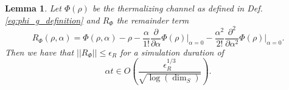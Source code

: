 \documentclass{article}
\newtheorem{lemma}[theorem]{Lemma}
\newcommand{\parens}[1]{\left( #1 \right)}
\newcommand{\norm}[1]{\left| \left| #1 \right| \right|}
\begin{document}
\begin{lemma} \label{lem:remainder_bound}
    Let $\Phi(\rho)$ be the thermalizing channel as defined in Def. \eqref{eq:phi_g_definition} and $R_{\Phi}$ the remainder term 
    \begin{equation}
        R_{\Phi}(\rho, \alpha) = \Phi(\rho, \alpha) - \rho - \frac{\alpha}{1!} \frac{\partial}{\partial \alpha} \Phi(\rho)\bigg|_{\alpha = 0} - \frac{\alpha^2}{2!} \frac{\partial^2}{\partial \alpha^2} \Phi(\rho) \bigg|_{\alpha = 0}.
    \end{equation}
    Then we have that $\norm{R_{\Phi}} \leq \epsilon_R$ for a simulation duration of
    \begin{equation}
        \alpha t \in O\parens{\frac{\epsilon_R^{1/3}}{ \sqrt{\log(\dim_S)}}}.
    \end{equation}
\end{lemma}
\end{document}
